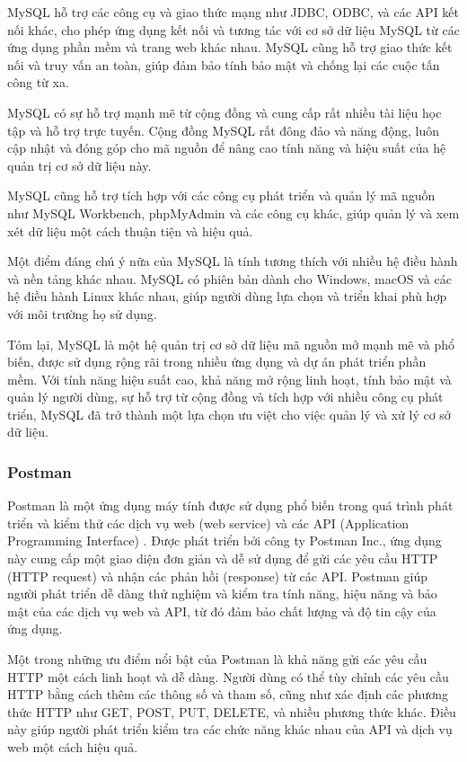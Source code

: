 MySQL hỗ trợ các công cụ và giao thức mạng như JDBC, ODBC, và các API kết nối khác, cho phép ứng dụng kết nối và tương tác với cơ sở dữ liệu MySQL từ các ứng dụng phần mềm và trang web khác nhau. MySQL cũng hỗ trợ giao thức kết nối và truy vấn an toàn, giúp đảm bảo tính bảo mật và chống lại các cuộc tấn công từ xa.

MySQL có sự hỗ trợ mạnh mẽ từ cộng đồng và cung cấp rất nhiều tài liệu học tập và hỗ trợ trực tuyến. Cộng đồng MySQL rất đông đảo và năng động, luôn cập nhật và đóng góp cho mã nguồn để nâng cao tính năng và hiệu suất của hệ quản trị cơ sở dữ liệu này.

MySQL cũng hỗ trợ tích hợp với các công cụ phát triển và quản lý mã nguồn như MySQL Workbench, phpMyAdmin và các công cụ khác, giúp quản lý và xem xét dữ liệu một cách thuận tiện và hiệu quả.

Một điểm đáng chú ý nữa của MySQL là tính tương thích với nhiều hệ điều hành và nền tảng khác nhau. MySQL có phiên bản dành cho Windows, macOS và các hệ điều hành Linux khác nhau, giúp người dùng lựa chọn và triển khai phù hợp với môi trường họ sử dụng.

Tóm lại, MySQL là một hệ quản trị cơ sở dữ liệu mã nguồn mở mạnh mẽ và phổ biến, được sử dụng rộng rãi trong nhiều ứng dụng và dự án phát triển phần mềm. Với tính năng hiệu suất cao, khả năng mở rộng linh hoạt, tính bảo mật và quản lý người dùng, sự hỗ trợ từ cộng đồng và tích hợp với nhiều công cụ phát triển, MySQL đã trở thành một lựa chọn ưu việt cho việc quản lý và xử lý cơ sở dữ liệu.


\subsubsection{Postman}
\mbox{}

Postman là một ứng dụng máy tính được sử dụng phổ biến trong quá trình phát triển và kiểm thử các dịch vụ web (web service) và các API (Application Programming Interface) \cite{postman_1}. Được phát triển bởi công ty Postman Inc., ứng dụng này cung cấp một giao diện đơn giản và dễ sử dụng để gửi các yêu cầu HTTP (HTTP request) và nhận các phản hồi (response) từ các API. Postman giúp người phát triển dễ dàng thử nghiệm và kiểm tra tính năng, hiệu năng và bảo mật của các dịch vụ web và API, từ đó đảm bảo chất lượng và độ tin cậy của ứng dụng.

Một trong những ưu điểm nổi bật của Postman là khả năng gửi các yêu cầu HTTP một cách linh hoạt và dễ dàng. Người dùng có thể tùy chỉnh các yêu cầu HTTP bằng cách thêm các thông số và tham số, cũng như xác định các phương thức HTTP như GET, POST, PUT, DELETE, và nhiều phương thức khác. Điều này giúp người phát triển kiểm tra các chức năng khác nhau của API và dịch vụ web một cách hiệu quả.

